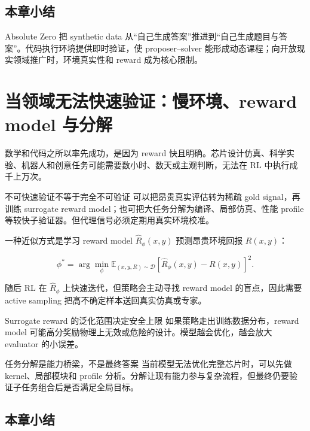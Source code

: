 \documentclass[a4paper]{article}
\begin{document}
\subsection{本章小结}

Absolute Zero 把 synthetic data 从“自己生成答案”推进到“自己生成题目与答案”。代码执行环境提供即时验证，使 proposer--solver 能形成动态课程；向开放现实领域推广时，环境真实性和 reward 成为核心限制。

\section{当领域无法快速验证：慢环境、reward model 与分解}


数学和代码之所以率先成功，是因为 reward 快且明确。芯片设计仿真、科学实验、机器人和创意任务可能需要数小时、数天或主观判断，无法在 RL 中执行成千上万次。

\begin{importantbox}{不可快速验证不等于完全不可验证}
可以把昂贵真实评估转为稀疏 gold signal，再训练 surrogate reward model；也可把大任务分解为编译、局部仿真、性能 profile 等较快子验证器。但代理信号必须定期用真实环境校准。
\end{importantbox}

一种近似方式是学习 reward model $\hat R_\phi(x,y)$ 预测昂贵环境回报 $R(x,y)$：

$$
\phi^*=\arg\min_\phi
\mathbb E_{(x,y,R)\sim \mathcal D}
\left[\hat R_\phi(x,y)-R(x,y)\right]^2.
$$

随后 RL 在 $\hat R_\phi$ 上快速迭代，但策略会主动寻找 reward model 的盲点，因此需要 active sampling 把高不确定样本送回真实仿真或专家。

\begin{warningbox}{Surrogate reward 的泛化范围决定安全上限}
如果策略走出训练数据分布，reward model 可能高分奖励物理上无效或危险的设计。模型越会优化，越会放大 evaluator 的小误差。
\end{warningbox}

\begin{knowledgebox}{任务分解是能力桥梁，不是最终答案}
当前模型无法优化完整芯片时，可以先做 kernel、局部模块和 profile 分析。分解让现有能力参与复杂流程，但最终仍要验证子任务组合后是否满足全局目标。
\end{knowledgebox}

\subsection{本章小结}
\end{document}
